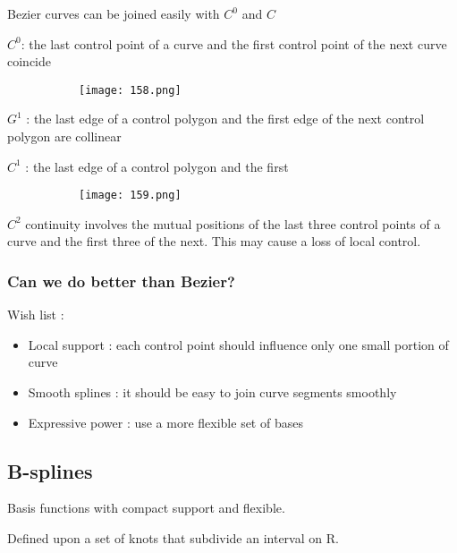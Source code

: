 \documentclass{article}
\begin{document}
Bezier curves can be joined easily with $C^0$ and $C$

$C^0$: the last control point of a curve and the first control point of the next curve coincide

    \begin{figure}[ht!]
  \centering
  \begin{subfigure}[b]{0.4\linewidth}
    \texttt{[image: 158.png]}
  \end{subfigure}
\end{figure}

$G^1$ : the last edge of a control polygon and the first edge of the next control polygon are collinear

$C^1$ : the last edge of a control polygon and the first

    \begin{figure}[ht!]
  \centering
  \begin{subfigure}[b]{0.4\linewidth}
    \texttt{[image: 159.png]}
  \end{subfigure}
\end{figure}

$C^2$ continuity involves the mutual positions of the last three control points of a curve and the first three of the next.  This may cause a loss of local control.

\subsubsection{Can we do better than Bezier?}

Wish list :

\begin{itemize}
    \item Local support : each control point should influence only one small portion of curve
    \item Smooth splines : it should be easy to join curve segments smoothly
    \item Expressive power : use a more flexible set of bases
\end{itemize}

\subsection{B-splines}

Basis functions with compact support and flexible.

Defined upon a set of knots that subdivide an interval on R.
\end{document}
